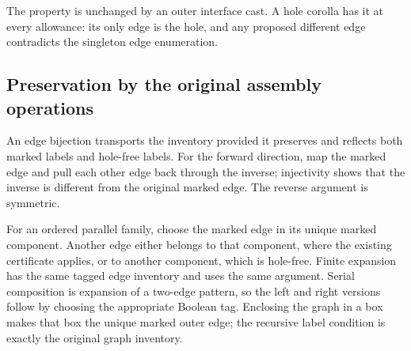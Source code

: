 The property is unchanged by an outer interface cast. A hole corolla has it
at every allowance: its only edge is the hole, and any proposed different
edge contradicts the singleton edge enumeration.











\subsection{Preservation by the original assembly operations}

An edge bijection transports the inventory provided it preserves and
reflects both marked labels and hole-free labels. For the forward direction,
map the marked edge and pull each other edge back through the inverse;
injectivity shows that the inverse is different from the original marked
edge. The reverse argument is symmetric.

For an ordered parallel family, choose the marked edge in its unique marked
component. Another edge either belongs to that component, where the existing
certificate applies, or to another component, which is hole-free. Finite
expansion has the same tagged edge inventory and uses the same argument.
Serial composition is expansion of a two-edge pattern, so the left and right
versions follow by choosing the appropriate Boolean tag. Enclosing the graph
in a box makes that box the unique marked outer edge; the recursive label
condition is exactly the original graph inventory.













